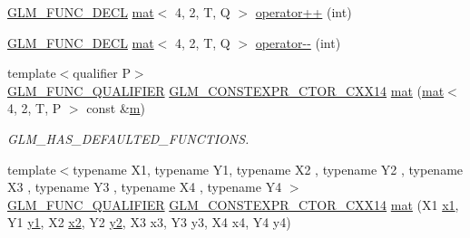 \begin{DoxyCompactItemize}
\hyperlink{setup_8hpp_ab2d052de21a70539923e9bcbf6e83a51}{G\+L\+M\+\_\+\+F\+U\+N\+C\+\_\+\+D\+E\+CL} \hyperlink{structglm_1_1mat}{mat}$<$ 4, 2, T, Q $>$ \hyperlink{structglm_1_1mat_3_014_00_012_00_01_t_00_01_q_01_4_ae81f2be5be6e25c0b903442b0ec65d9c}{operator++} (int)
\item 
\hyperlink{setup_8hpp_ab2d052de21a70539923e9bcbf6e83a51}{G\+L\+M\+\_\+\+F\+U\+N\+C\+\_\+\+D\+E\+CL} \hyperlink{structglm_1_1mat}{mat}$<$ 4, 2, T, Q $>$ \hyperlink{structglm_1_1mat_3_014_00_012_00_01_t_00_01_q_01_4_a3fb0499b3c4e78d4d52ad9ee06146c06}{operator-\/-\/} (int)
\item 
{\footnotesize template$<$qualifier P$>$ }\\\hyperlink{setup_8hpp_a33fdea6f91c5f834105f7415e2a64407}{G\+L\+M\+\_\+\+F\+U\+N\+C\+\_\+\+Q\+U\+A\+L\+I\+F\+I\+ER} \hyperlink{setup_8hpp_a0900f9145e68bf6061b6f5e7be3fa751}{G\+L\+M\+\_\+\+C\+O\+N\+S\+T\+E\+X\+P\+R\+\_\+\+C\+T\+O\+R\+\_\+\+C\+X\+X14} \hyperlink{structglm_1_1mat_3_014_00_012_00_01_t_00_01_q_01_4_a780dbdda12c004d1894b31daede7e9ce}{mat} (\hyperlink{structglm_1_1mat}{mat}$<$ 4, 2, T, P $>$ const \&\hyperlink{_s_d_l__opengl__glext_8h_af593500c283bf1a787a6f947f503a5c2}{m})
\begin{DoxyCompactList}\small\item\em G\+L\+M\+\_\+\+H\+A\+S\+\_\+\+D\+E\+F\+A\+U\+L\+T\+E\+D\+\_\+\+F\+U\+N\+C\+T\+I\+O\+NS. \end{DoxyCompactList}\item 
{\footnotesize template$<$typename X1, typename Y1, typename X2 , typename Y2 , typename X3 , typename Y3 , typename X4 , typename Y4 $>$ }\\\hyperlink{setup_8hpp_a33fdea6f91c5f834105f7415e2a64407}{G\+L\+M\+\_\+\+F\+U\+N\+C\+\_\+\+Q\+U\+A\+L\+I\+F\+I\+ER} \hyperlink{setup_8hpp_a0900f9145e68bf6061b6f5e7be3fa751}{G\+L\+M\+\_\+\+C\+O\+N\+S\+T\+E\+X\+P\+R\+\_\+\+C\+T\+O\+R\+\_\+\+C\+X\+X14} \hyperlink{structglm_1_1mat_3_014_00_012_00_01_t_00_01_q_01_4_abafe54829e43297a21e26ae004aa8db0}{mat} (X1 \hyperlink{_s_d_l__opengl__glext_8h_a49825216c96caaeb09237b36651181c5}{x1}, Y1 \hyperlink{_s_d_l__opengl__glext_8h_a3af6c78fcdfccea028a5878bc747ef39}{y1}, X2 \hyperlink{_s_d_l__opengl__glext_8h_a7b907a03236685c534d89d604cff23c8}{x2}, Y2 \hyperlink{_s_d_l__opengl__glext_8h_a2be1135ed68e8d80fa9e130c7814f8c2}{y2}, X3 x3, Y3 y3, X4 x4, Y4 y4)
\item 

\end{DoxyCompactItemize}

